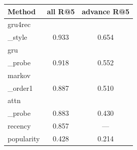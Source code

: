 \begin{tabular}{lcc}
\toprule
Method & all R@5 & advance R@5 \\
\midrule
gru4rec\\_style & 0.933 & 0.654 \\
gru\\_probe & 0.918 & 0.552 \\
markov\\_order1 & 0.887 & 0.510 \\
attn\\_probe & 0.883 & 0.430 \\
recency & 0.857 & — \\
popularity & 0.428 & 0.214 \\
\bottomrule
\end{tabular}
